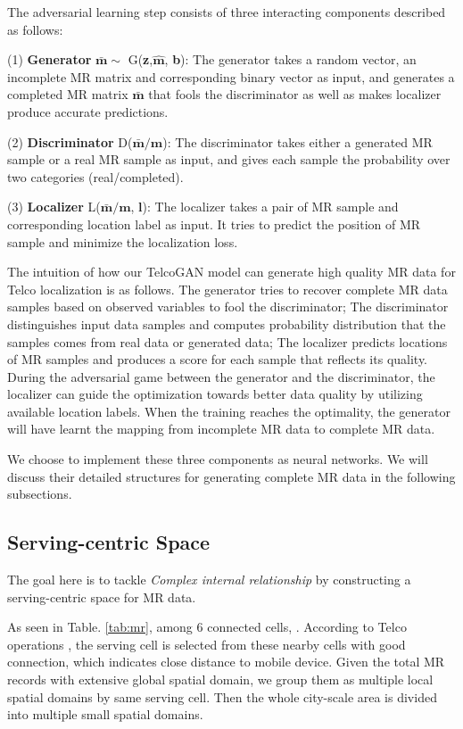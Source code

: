 The adversarial learning step consists of three interacting components described as follows:

(1) \textbf{Generator} $\bar{\textbf{m}}\sim$ G(\textbf{z},$\hat{\textbf{m}}$, \textbf{b}): The generator takes a random vector, an incomplete MR matrix and corresponding binary vector as input, and generates a completed MR matrix $\bar{\textbf{m}}$ that fools the discriminator as well as makes localizer produce accurate predictions.

(2) \textbf{Discriminator} D($\bar{\textbf{m}}/\textbf{m}$): The discriminator takes either a generated MR sample or a real MR sample as input, and gives each sample the probability over two categories (real/completed).

(3) \textbf{Localizer} L($\bar{\textbf{m}}/\textbf{m}$, $\textbf{l}$): The localizer takes a pair of MR sample and corresponding location label as input. It tries to predict the position of MR sample and minimize the localization loss.

The intuition of how our TelcoGAN model can generate high quality MR data for Telco localization is as follows. The generator tries to recover complete MR data samples based on observed variables to fool the discriminator; The discriminator distinguishes input data samples and computes probability distribution that the samples comes from real data or generated data; The localizer predicts locations of MR samples and produces a score for each sample that reflects its quality. During the adversarial game between the generator and the discriminator, the localizer can guide the optimization towards better data quality by utilizing available location labels. When the training reaches the optimality, the generator will have learnt the mapping from incomplete MR data to complete MR data.

We choose to implement these three components as neural networks. We will discuss their detailed structures for generating complete MR data in the following subsections.


\subsection{Serving-centric Space}
The goal here is to tackle \emph{Complex internal relationship} by constructing a serving-centric space for MR data.

As seen in Table. \ref{tab:mr}, among 6 connected cells, . According to Telco operations \cite{DBLP:conf/infocom/RayDM16}, the serving cell is selected from these nearby cells with good connection, which indicates close distance to mobile device. Given the total MR records with extensive global spatial domain, we group them as multiple local spatial domains by same serving cell. Then the whole city-scale area is divided into multiple small spatial domains.

